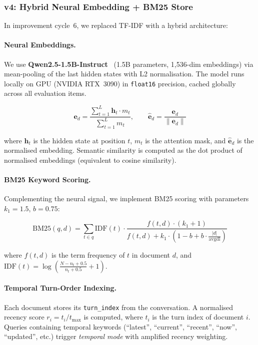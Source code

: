 \documentclass[11pt,a4paper]{article}
\begin{document}
\subsubsection{v4: Hybrid Neural Embedding + BM25 Store}
\label{sec:hybrid-store}

In improvement cycle~6, we replaced TF-IDF with a hybrid architecture:

\paragraph{Neural Embeddings.}
We use \textbf{Qwen2.5-1.5B-Instruct}~\cite{qwen2025} (1.5B parameters,
1{,}536-dim embeddings) via mean-pooling of the last hidden states with
L2 normalisation.  The model runs locally on GPU (NVIDIA RTX~3090) in
\texttt{float16} precision, cached globally across all evaluation items.

\begin{equation}
    \mathbf{e}_d = \frac{\sum_{t=1}^{L} \mathbf{h}_t \cdot m_t}
                        {\sum_{t=1}^{L} m_t}, \qquad
    \hat{\mathbf{e}}_d = \frac{\mathbf{e}_d}{\|\mathbf{e}_d\|}
\label{eq:embedding}
\end{equation}

where $\mathbf{h}_t$ is the hidden state at position $t$, $m_t$ is the
attention mask, and $\hat{\mathbf{e}}_d$ is the normalised embedding.
Semantic similarity is computed as the dot product of normalised embeddings
(equivalent to cosine similarity).

\paragraph{BM25 Keyword Scoring.}
Complementing the neural signal, we implement BM25 scoring with parameters
$k_1 = 1.5$, $b = 0.75$:

\begin{equation}
    \text{BM25}(q, d) = \sum_{t \in q} \text{IDF}(t) \cdot
    \frac{f(t, d) \cdot (k_1 + 1)}{f(t, d) + k_1 \cdot
    \left(1 - b + b \cdot \frac{|d|}{\text{avgdl}}\right)}
\label{eq:bm25}
\end{equation}

where $f(t, d)$ is the term frequency of $t$ in document $d$, and
$\text{IDF}(t) = \log\!\left(\frac{N - n_t + 0.5}{n_t + 0.5} + 1\right)$.

\paragraph{Temporal Turn-Order Indexing.}
Each document stores its \texttt{turn\_index} from the conversation.
A normalised recency score $r_i = t_i / t_{\max}$ is computed, where $t_i$ is
the turn index of document $i$.  Queries containing temporal keywords
(``latest'', ``current'', ``recent'', ``now'', ``updated'', etc.) trigger
\emph{temporal mode} with amplified recency weighting.
\end{document}
